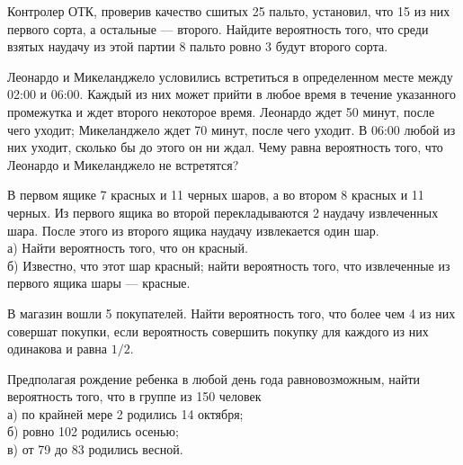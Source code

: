\newpage\setcounter{zad}{0}



\begin{zkrW}{20}\noindent 
	Контролер ОТК, проверив качество сшитых 25 пальто, установил, что 15 из них первого сорта, а остальные --- второго. Найдите вероятность того, что среди взятых наудачу из этой партии 8 пальто ровно 3 будут второго сорта.
 
\end{zkrW}

\begin{zkrW}{20}\noindent 
	Леонардо и Микеланджело условились встретиться в определенном месте между 02:00 и 06:00. Каждый из них может прийти в любое время в течение указанного промежутка и ждет второго некоторое время. Леонардо ждет 50 минут, после чего уходит; Микеланджело ждет 70 минут, после чего уходит. В 06:00 любой из них уходит, сколько бы до этого он ни ждал. Чему равна вероятность того, что Леонардо и Микеланджело не встретятся?
 
\end{zkrW}

\begin{zkrW}{20}\noindent 
	В первом ящике 7 красных и 11 черных шаров, а во втором 8 красных и 11 черных. Из первого ящика во второй перекладываются 2 наудачу извлеченных шара. После этого из второго ящика наудачу извлекается один шар. \\ \indent а) Найти вероятность того, что он красный. \\ \indent б) Известно, что этот шар красный; найти вероятность того, что извлеченные из первого ящика шары --- красные.
 
\end{zkrW}

\begin{zkrW}{20}\noindent 
	В магазин вошли 5 покупателей. Найти вероятность того, что более чем 4 из них совершат покупки, если вероятность совершить покупку для каждого из них одинакова и равна $1/2$.
 
\end{zkrW}

\begin{zkrW}{20}\noindent 
	Предполагая рождение ребенка в любой день года равновозможным, найти вероятность того, что в группе из 150 человек \\ \indent а) по крайней мере 2 родились 14 октября; \\ \indent б) ровно 102 родились осенью; \\ \indent в) от 79 до 83 родились весной.
 
\end{zkrW}

